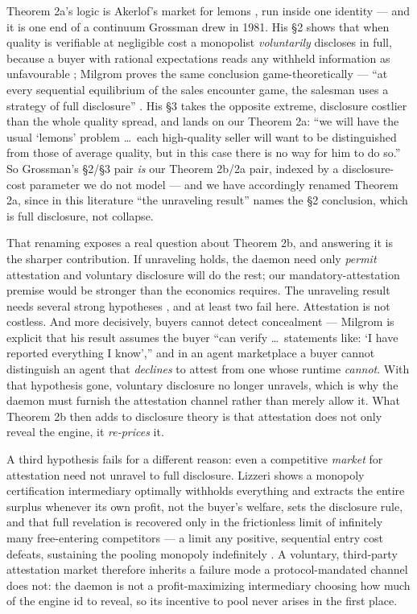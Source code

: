 \documentclass[11pt,a4paper]{article}
\begin{document}
Theorem 2a's logic is Akerlof's market for lemons \cite{akerlof}, run inside one identity --- and it is one end of a continuum
Grossman drew in 1981. His §2 shows that when quality is verifiable at negligible cost a monopolist \emph{voluntarily} discloses
in full, because a buyer with rational expectations reads any withheld information as unfavourable \cite{grossman1981}; Milgrom
proves the same conclusion game-theoretically --- ``at every sequential equilibrium of the sales encounter game, the salesman
uses a strategy of full disclosure'' \cite{milgrom1981}. His §3 takes the opposite extreme, disclosure costlier than the whole
quality spread, and lands on our Theorem 2a: ``we will have the usual `lemons' problem \dots\ each high-quality seller will want
to be distinguished from those of average quality, but in this case there is no way for him to do so.'' So Grossman's §2/§3 pair
\emph{is} our Theorem 2b/2a pair, indexed by a disclosure-cost parameter we do not model --- and we have accordingly renamed
Theorem 2a, since in this literature ``the unraveling result'' names the §2 conclusion, which is full disclosure, not collapse.

That renaming exposes a real question about Theorem 2b, and answering it is the sharper contribution. If unraveling holds, the
daemon need only \emph{permit} attestation and voluntary disclosure will do the rest; our mandatory-attestation premise would be
stronger than the economics requires. The unraveling result needs several strong hypotheses \cite{dranove-jin}, and at least two
fail here. Attestation is not costless. And more decisively, buyers cannot detect concealment --- Milgrom is explicit that his
result assumes the buyer ``can verify \dots\ statements like: `I have reported everything I know','' and in an agent marketplace
a buyer cannot distinguish an agent that \emph{declines} to attest from one whose runtime \emph{cannot}. With that hypothesis
gone, voluntary disclosure no longer unravels, which is why the daemon must furnish the attestation channel rather than merely
allow it. What Theorem 2b then adds to disclosure theory is that attestation does not only reveal the engine, it \emph{re-prices}
it.

A third hypothesis fails for a different reason: even a competitive \emph{market} for attestation need not unravel to full
disclosure. Lizzeri shows a monopoly certification intermediary optimally withholds everything and extracts the entire surplus
whenever its own profit, not the buyer's welfare, sets the disclosure rule, and that full revelation is recovered only in the
frictionless limit of infinitely many free-entering competitors --- a limit any positive, sequential entry cost defeats,
sustaining the pooling monopoly indefinitely \cite{lizzeri99}. A voluntary, third-party attestation market therefore inherits a
failure mode a protocol-mandated channel does not: the daemon is not a profit-maximizing intermediary choosing how much of the
engine id to reveal, so its incentive to pool never arises in the first place.
\end{document}
